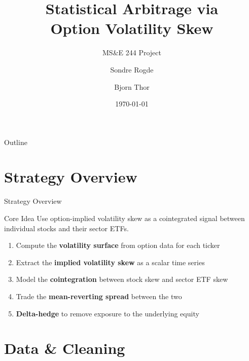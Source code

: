 \documentclass{beamer}
\title[Option Skew Statistical Arbitrage]{Statistical Arbitrage via\\Option Volatility Skew}
\subtitle{MS\&E 244 Project}
\author{Sondre Rogde \and Bjorn Thor}
\date{\today}
\begin{document}
\begin{frame}
  \titlepage
\end{frame}

\begin{frame}{Outline}
  \tableofcontents
\end{frame}

\section{Strategy Overview}

\begin{frame}{Strategy Overview}
  \begin{block}{Core Idea}
    Use option-implied volatility skew as a cointegrated signal between
    individual stocks and their sector ETFs.
  \end{block}
  \vspace{0.5em}
  \begin{enumerate}
    \item Compute the \textbf{volatility surface} from option data for each ticker
    \item Extract the \textbf{implied volatility skew} as a scalar time series
    \item Model the \textbf{cointegration} between stock skew and sector ETF skew
    \item Trade the \textbf{mean-reverting spread} between the two
    \item \textbf{Delta-hedge} to remove exposure to the underlying equity
  \end{enumerate}
\end{frame}

\section{Data \& Cleaning}
\end{document}
